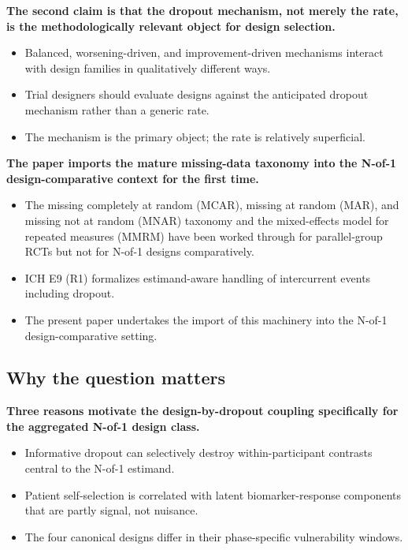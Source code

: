 \documentclass[
  11pt,
]{article}
\begin{document}
\textbf{The second claim is that the dropout mechanism, not merely the rate, is the methodologically relevant object for design selection.}

\begin{itemize}\setlength{\itemsep}{2pt}\setlength{\parskip}{0pt}
\item Balanced, worsening-driven, and improvement-driven mechanisms interact with design families in qualitatively different ways.
\item Trial designers should evaluate designs against the anticipated dropout mechanism rather than a generic rate.
\item The mechanism is the primary object; the rate is relatively superficial.
\end{itemize}

\textbf{The paper imports the mature missing-data taxonomy into the N-of-1 design-comparative context for the first time.}

\begin{itemize}\setlength{\itemsep}{2pt}\setlength{\parskip}{0pt}
\item The missing completely at random (MCAR), missing at random (MAR), and missing not at random (MNAR) taxonomy and the mixed-effects model for repeated measures (MMRM) have been worked through for parallel-group RCTs but not for N-of-1 designs comparatively.
\item ICH E9 (R1) formalizes estimand-aware handling of intercurrent events including dropout.
\item The present paper undertakes the import of this machinery into the N-of-1 design-comparative setting.
\end{itemize}

\subsection{Why the question matters}\label{why-the-question-matters}

\textbf{Three reasons motivate the design-by-dropout coupling specifically for the aggregated N-of-1 design class.}

\begin{itemize}\setlength{\itemsep}{2pt}\setlength{\parskip}{0pt}
\item Informative dropout can selectively destroy within-participant contrasts central to the N-of-1 estimand.
\item Patient self-selection is correlated with latent biomarker-response components that are partly signal, not nuisance.
\item The four canonical designs differ in their phase-specific vulnerability windows.
\end{itemize}
\end{document}
